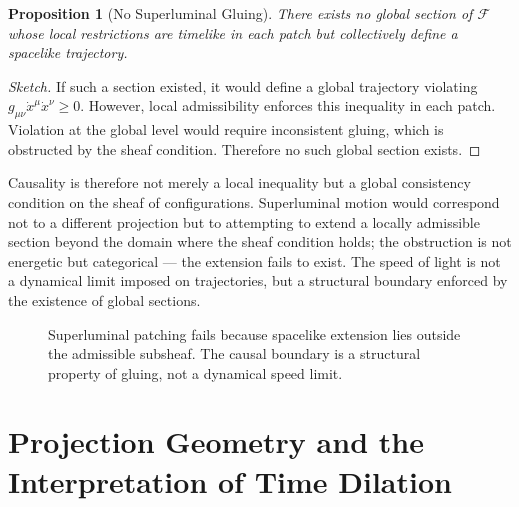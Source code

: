 \documentclass[11pt, a4paper, twocolumn]{article}
\newtheorem{proposition}[definition]{Proposition}
\begin{document}
\begin{proposition}[No Superluminal Gluing]
There exists no global section of $\mathcal{F}$ whose local restrictions are
timelike in each patch but collectively define a spacelike trajectory.
\end{proposition}

\begin{proof}[Sketch]
If such a section existed, it would define a global trajectory violating
$g_{\mu\nu}\dot{x}^\mu\dot{x}^\nu \geq 0$. However, local admissibility
enforces this inequality in each patch. Violation at the global level would
require inconsistent gluing, which is obstructed by the sheaf condition.
Therefore no such global section exists.
\end{proof}

Causality is therefore not merely a local inequality but a global consistency
condition on the sheaf of configurations. Superluminal motion would correspond
not to a different projection but to attempting to extend a locally admissible
section beyond the domain where the sheaf condition holds; the obstruction is
not energetic but categorical --- the extension fails to exist. The speed of
light is not a dynamical limit imposed on trajectories, but a structural
boundary enforced by the existence of global sections.

\begin{figure}[ht]
\centering
{}
\caption{Superluminal patching fails because spacelike extension lies outside the admissible subsheaf. The causal boundary is a structural property of gluing, not a dynamical speed limit.}
\end{figure}

\section{Projection Geometry and the Interpretation of Time Dilation}
\end{document}
